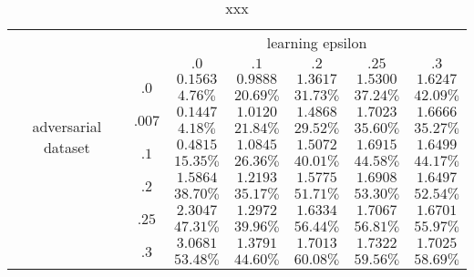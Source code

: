		\begin{table}[h]
		\centering
		        \begin{tabular}{cc||ccccc}

		        	& &  \multicolumn{5}{c}{learning epsilon} \\
		        	& &  $.0$ & $.1$ & $.2$ & $.25$ & $.3$ \\
		            \hline \hline
		            \multirow{8}{*}{adversarial dataset} 
		            	& \multirow{2}{*}{$.0$}  & $0.1563	$ &$0.9888	$ &$1.3617	$ &$1.5300	$ &$1.6247	$  \\ 
		            	&                        & $4.76\%	$ &$20.69\%	$ &$31.73\%	$ &$37.24\%	$ &$42.09\%	$  \\ \cline{2-7} 
		            	& \multirow{2}{*}{$.007$}& $0.1447	$ &$1.0120	$ &$1.4868	$ &$1.7023	$ &$1.6666	$  \\ 
		            	&                        & $4.18\%	$ &$21.84\%	$ &$29.52\%	$ &$35.60\%	$ &$35.27\%	$  \\ \cline{2-7} 
		            	& \multirow{2}{*}{$.1$}  & $0.4815	$ &$1.0845	$ &$1.5072	$ &$1.6915	$ &$1.6499	$  \\
		            	&                        & $15.35\%	$ &$26.36\%	$ &$40.01\%	$ &$44.58\%	$ &$44.17\%	$  \\ \cline{2-7}
		                & \multirow{2}{*}{$.2$}  & $1.5864	$ &$1.2193	$ &$1.5775	$ &$1.6908	$ &$1.6497	$  \\
		                &                        & $38.70\%	$ &$35.17\%	$ &$51.71\%	$ &$53.30\%	$ &$52.54\%	$  \\ \cline{2-7}
		                & \multirow{2}{*}{$.25$} & $2.3047	$ &$1.2972	$ &$1.6334	$ &$1.7067	$ &$1.6701	$  \\
		                &                        & $47.31\%	$ &$39.96\%	$ &$56.44\%	$ &$56.81\%	$ &$55.97\%	$  \\ \cline{2-7}
		                & \multirow{2}{*}{$.3$}  & $3.0681	$ &$1.3791	$ &$1.7013	$ &$1.7322	$ &$1.7025	$  \\
		                &                        & $53.48\%	$ &$44.60\%	$ &$60.08\%	$ &$59.56\%	$ &$58.69\%	$  \\

		            
		        \end{tabular}
		    \caption{xxx}
		    \label{tab:xxx}
		\end{table}